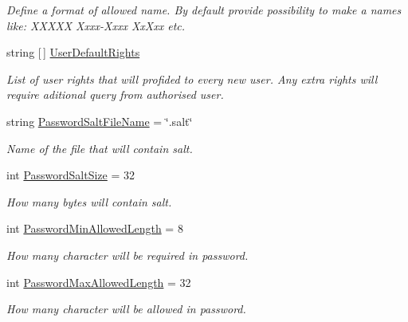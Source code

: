 \begin{DoxyCompactItemize}
\begin{DoxyCompactList}\small\item\em Define a format of allowed name. By default provide possibility to make a names like\+: X\+X\+X\+XX Xxxx-\/\+Xxxx Xx\textquotesingle{}Xxx etc. \end{DoxyCompactList}\item 
string \mbox{[}$\,$\mbox{]} \mbox{\hyperlink{class_authority_controller_1_1_data_1_1_application_1_1_config_a4f98440aff22ba7124faf929df4401ba}{User\+Default\+Rights}}
\begin{DoxyCompactList}\small\item\em List of user rights that will profided to every new user. Any extra rights will require aditional query from authorised user. \end{DoxyCompactList}\item 
string \mbox{\hyperlink{class_authority_controller_1_1_data_1_1_application_1_1_config_af2c4e3d6eba2ff61eed570390bfdcc14}{Password\+Salt\+File\+Name}} = \char`\"{}.salt\char`\"{}
\begin{DoxyCompactList}\small\item\em Name of the file that will contain salt. \end{DoxyCompactList}\item 
int \mbox{\hyperlink{class_authority_controller_1_1_data_1_1_application_1_1_config_a0b7dd2a319692cc608de89f4a463cb61}{Password\+Salt\+Size}} = 32
\begin{DoxyCompactList}\small\item\em How many bytes will contain salt. \end{DoxyCompactList}\item 
int \mbox{\hyperlink{class_authority_controller_1_1_data_1_1_application_1_1_config_ac6d18cfffc86aaa2443a06a90a688eb1}{Password\+Min\+Allowed\+Length}} = 8
\begin{DoxyCompactList}\small\item\em How many character will be required in password. \end{DoxyCompactList}\item 
int \mbox{\hyperlink{class_authority_controller_1_1_data_1_1_application_1_1_config_a04f768eacbc58e94bd7f5122eaf659fb}{Password\+Max\+Allowed\+Length}} = 32
\begin{DoxyCompactList}\small\item\em How many character will be allowed in password. \end{DoxyCompactList}\item 

\end{DoxyCompactItemize}
